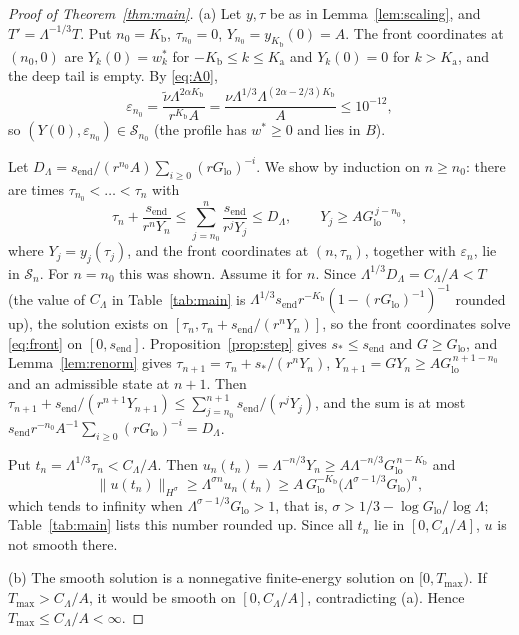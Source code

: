 \documentclass[12pt,reqno]{amsart}
\numberwithin{equation}{section}
\theoremstyle{plain}
\theoremstyle{definition}
\theoremstyle{remark}
\newcommand{\Kb}{K_{\mathrm b}}
\newcommand{\Ka}{K_{\mathrm a}}
\newcommand{\Glo}{G_{\mathrm{lo}}}
\newcommand{\send}{s_{\mathrm{end}}}
\newcommand{\eps}{\varepsilon}
\begin{document}
\begin{proof}[Proof of Theorem~\ref{thm:main}]
(a) Let $y,\tau$ be as in Lemma~\ref{lem:scaling}, and $T'=\Lambda^{-1/3}T$.
Put $n_0=\Kb$, $\tau_{n_0}=0$, $Y_{n_0}=y_{\Kb}(0)=A$. The front coordinates at
$(n_0,0)$ are $Y_k(0)=w^*_k$ for $-\Kb\le k\le\Ka$ and $Y_k(0)=0$ for $k>\Ka$, and
the deep tail is empty. By \eqref{eq:A0},
\[
  \eps_{n_0}=\frac{\tilde\nu\Lambda^{2\alpha\Kb}}{r^{\Kb}A}
  =\frac{\nu\Lambda^{1/3}\Lambda^{(2\alpha-2/3)\Kb}}{A}\le10^{-12},
\]
so $(Y(0),\eps_{n_0})\in\mathcal S_{n_0}$ (the profile has $w^*\ge0$ and lies in
$B$).

Let $D_\Lambda=\send/(r^{n_0}A)\sum_{i\ge0}(r\Glo)^{-i}$. We show by induction on
$n\ge n_0$: there are times $\tau_{n_0}<\dots<\tau_n$ with
\begin{equation}\label{eq:induction}
  \tau_n+\frac{\send}{r^nY_n}\le\sum_{j=n_0}^{n}\frac{\send}{r^jY_j}\le D_\Lambda,\qquad
  Y_j\ge A\Glo^{\,j-n_0},
\end{equation}
where $Y_j=y_j(\tau_j)$, and the front coordinates at $(n,\tau_n)$, together
with $\eps_n$, lie in $\mathcal S_n$. For $n=n_0$ this was shown. Assume it for
$n$. Since $\Lambda^{1/3}D_\Lambda=C_\Lambda/A<T$ (the value of $C_\Lambda$ in
Table~\ref{tab:main} is $\Lambda^{1/3}\send r^{-\Kb}(1-(r\Glo)^{-1})^{-1}$ rounded
up), the solution exists on $[\tau_n,\tau_n+\send/(r^nY_n)]$, so the front
coordinates solve \eqref{eq:front} on $[0,\send]$. Proposition~\ref{prop:step}
gives $s_*\le\send$ and $G\ge\Glo$, and Lemma~\ref{lem:renorm} gives
$\tau_{n+1}=\tau_n+s_*/(r^nY_n)$, $Y_{n+1}=GY_n\ge A\Glo^{\,n+1-n_0}$ and an admissible
state at $n+1$. Then
$\tau_{n+1}+\send/(r^{n+1}Y_{n+1})\le\sum_{j=n_0}^{n+1}\send/(r^jY_j)$, and the sum is at
most $\send r^{-n_0}A^{-1}\sum_{i\ge0}(r\Glo)^{-i}=D_\Lambda$.

Put $t_n=\Lambda^{1/3}\tau_n<C_\Lambda/A$. Then
$u_n(t_n)=\Lambda^{-n/3}Y_n\ge A\Lambda^{-n/3}\Glo^{\,n-\Kb}$ and
\[
  \|u(t_n)\|_{H^\sigma}\ge\Lambda^{\sigma n}u_n(t_n)\ge A\,\Glo^{-\Kb}\bigl(\Lambda^{\sigma-1/3}\Glo\bigr)^n,
\]
which tends to infinity when $\Lambda^{\sigma-1/3}\Glo>1$, that is,
$\sigma>1/3-\log\Glo/\log\Lambda$; Table~\ref{tab:main} lists this number rounded up.
Since all $t_n$ lie in $[0,C_\Lambda/A]$, $u$ is not smooth there.

(b) The smooth solution is a nonnegative finite-energy solution on
$[0,T_{\max})$. If $T_{\max}>C_\Lambda/A$, it would be smooth on $[0,C_\Lambda/A]$,
contradicting (a). Hence $T_{\max}\le C_\Lambda/A<\infty$.


\end{proof}
\end{document}
